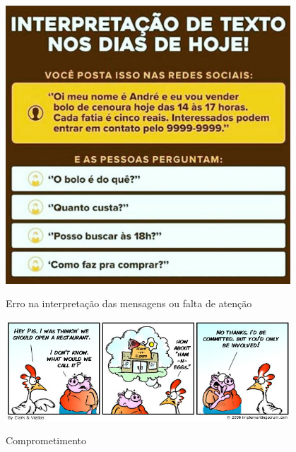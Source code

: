 \begin{figure}
    \centering
    \caption{Erro na interpretação das mensagens ou falta de atenção}
	\includegraphics[width=0.95\textwidth]{erros/vendo_bolo_cenoura.jpg}
    \label{fig:vendo_bolo_cenoura}
\end{figure}



\begin{figure}
    \centering
    \caption{Comprometimento}
	\includegraphics[width=0.95\textwidth]{erros/060911-scrumtoon.jpg}
    \label{fig:scrum}
\end{figure}

